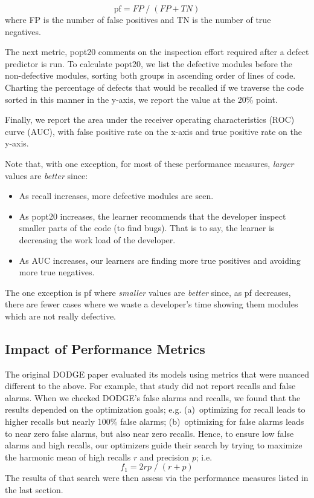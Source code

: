 \documentclass[10pt,compsoc,twocolumn]{IEEEtran}
\begin{document}
\[
     \text{pf} =  \mathit{FP}\;/\;(\mathit{FP}+\mathit{TN}) %
\]
where FP is the number of false positives and TN is the number of true negatives. 

The next metric, popt20 comments on the inspection effort required after a defect predictor is run. To calculate popt20, we list the defective modules before the non-defective modules, sorting both groups in ascending order of lines of code. Charting the percentage of defects that would be recalled if we traverse the code sorted in this manner in the y-axis, we report the value at the 20\% point. 


Finally, we report the area under the receiver operating characteristics (ROC) curve (AUC), with false positive rate on the x-axis and true positive rate on the y-axis.

Note
that, with one exception,  for most of these performance measures, {\em larger} values are {\em better} since:
\begin{itemize}
\item
As  recall increases,
  more defective modules are seen.   

 \item
 As  popt20 increases, the  learner recommends that the developer inspect  smaller parts of the code (to find bugs).
 That is to say, the learner is decreasing the work load of the developer.   
  \item
  As  AUC increases, our learners  are finding more true positives and avoiding more true negatives.

\end{itemize}
The one exception is pf where {\em smaller} values are {\em better} since,
 as   pf decreases,
there are fewer cases where we waste a developer's time showing them modules which are not really defective. 

\subsection{Impact of Performance Metrics}
The original DODGE paper evaluated its models using metrics that were nuanced different to the above.
For example,
that study did not report recalls and false alarms.
When  we checked DODGE's false alarms and recalls, we found that the results depended on the optimization goals; e.g. (a)~optimizing 
 for recall  leads to higher  recalls but nearly 100\% false alarms;
(b)~optimizing  for false alarms  leads to near zero false alarms, but also near zero recalls. Hence, 
to ensure low false alarms and high recalls, our optimizers guide their search by trying to maximize the harmonic mean of high recalls $r$ and precision {\em p}; i.e. 
\[ f_1 = 2rp\;/\;(r+p)\]The results of that search were then assess via the performance measures listed in the last section.
\end{document}
